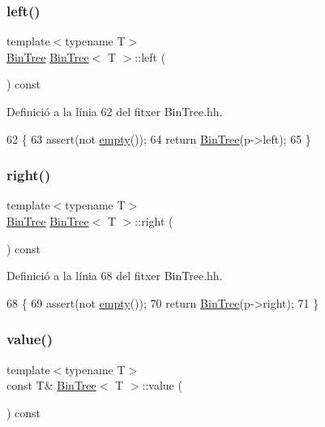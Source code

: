 \subsubsection{\texorpdfstring{left()}{left()}}
{\footnotesize\ttfamily template$<$typename T$>$ \\
\hyperlink{class_bin_tree}{Bin\+Tree} \hyperlink{class_bin_tree}{Bin\+Tree}$<$ T $>$\+::left (\begin{DoxyParamCaption}{ }\end{DoxyParamCaption}) const}



Definició a la línia 62 del fitxer Bin\+Tree.\+hh.


\begin{DoxyCode}
62                           \{
63         assert(not \hyperlink{class_bin_tree_a74cda259ba5c25b8ee38ed4dc33e4fad}{empty}());
64         \textcolor{keywordflow}{return} \hyperlink{class_bin_tree_a47eef22d29cd023449d97c073c08e5b6}{BinTree}(p->left);
65     \}
\end{DoxyCode}
\mbox{\label{class_bin_tree_aff8e96651b27284c329667b5ad3e4d0b}} 
\subsubsection{\texorpdfstring{right()}{right()}}
{\footnotesize\ttfamily template$<$typename T$>$ \\
\hyperlink{class_bin_tree}{Bin\+Tree} \hyperlink{class_bin_tree}{Bin\+Tree}$<$ T $>$\+::right (\begin{DoxyParamCaption}{ }\end{DoxyParamCaption}) const}



Definició a la línia 68 del fitxer Bin\+Tree.\+hh.


\begin{DoxyCode}
68                            \{
69         assert(not \hyperlink{class_bin_tree_a74cda259ba5c25b8ee38ed4dc33e4fad}{empty}());
70         \textcolor{keywordflow}{return} \hyperlink{class_bin_tree_a47eef22d29cd023449d97c073c08e5b6}{BinTree}(p->right);
71     \}
\end{DoxyCode}
\mbox{\label{class_bin_tree_a734e785b089c87b49187ee7c58edf5f3}} 
\subsubsection{\texorpdfstring{value()}{value()}}
{\footnotesize\ttfamily template$<$typename T$>$ \\
const T\& \hyperlink{class_bin_tree}{Bin\+Tree}$<$ T $>$\+::value (\begin{DoxyParamCaption}{ }\end{DoxyParamCaption}) const}



